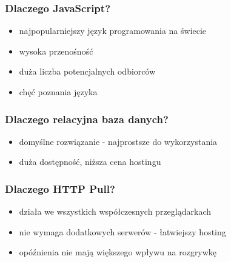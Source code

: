 \documentclass[12pt]{beamer}
\begin{document}
\begin{frame}
  \frametitle{Dlaczego JavaScript?}
  \begin{itemize}
  \item najpopularniejszy język programowania na świecie
  \item wysoka przenośność
  \item duża liczba potencjalnych odbiorców
  \item chęć poznania języka
  \end{itemize}
\end{frame}

\begin{frame}
  \frametitle{Dlaczego relacyjna baza danych?}
  \begin{itemize}
  \item domyślne rozwiązanie - najprostsze do wykorzystania
  \item duża dostępność, niższa cena hostingu
  \end{itemize}
\end{frame}

\begin{frame}
  \frametitle{Dlaczego HTTP Pull?}
  \begin{itemize}
  \item działa we wszystkich współczesnych przeglądarkach
  \item nie wymaga dodatkowych serwerów - łatwiejszy hosting
  \item opóźnienia nie mają większego wpływu na rozgrywkę
  \end{itemize}
\end{frame}
\end{document}
